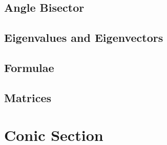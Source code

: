 \documentclass[journal]{IEEEtran}
\begin{document}
\subsection{Angle Bisector}

\subsection{Eigenvalues and Eigenvectors}

\subsection{Formulae}

\subsection{Matrices}

\newpage
\section{Conic Section}

\end{document}
